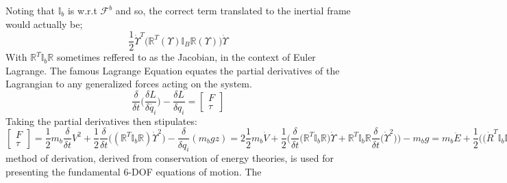 Noting that $\mathbb{I}_b$ is w.r.t $\mathcal{F}^b$ and so, the correct term translated to the inertial frame would actually be;
\begin{equation}
\frac{1}{2}\dot{\Upsilon}^T\big(\mathbb{R}^T(\Upsilon)\mathbb{I}_B\mathbb{R}(\Upsilon)\big)\dot{\Upsilon}
\end{equation} 
With $\mathbb{R}^T\mathbb{I}_b\mathbb{R}$ sometimes reffered to as the Jacobian, in the context of Euler Lagrange. The famous Lagrange Equation equates the partial derivatives of the Lagrangian to any generalized forces acting on the system.
\begin{equation}
\frac{\delta}{\delta t}\bigg(\frac{\delta L}{\delta \dot{q_i}}\bigg)-\frac{\delta L}{\delta q_i} = \begin{bmatrix}
F\\
\tau
\end{bmatrix}
\end{equation}
Taking the partial derivatives then stipulates:
\begin{subequations}
\begin{equation}
\begin{bmatrix}
F\\
\tau
\end{bmatrix}
=
\frac{1}{2}m_b\frac{\delta}{\delta t}V^2+\frac{1}{2}\frac{\delta}{\delta t}\big((\mathbb{R}^{T}\mathbb{I}_b\mathbb{R})\dot{\Upsilon}^{2}\big)-\frac{\delta}{\delta q_i}(m_bgz)
\end{equation}
\begin{equation}
=2\frac{1}{2}m_b\dot{V}+\frac{1}{2}\bigg(\frac{\delta}{\delta t}\big(\mathbb{R}^T\mathbb{I}_b\mathbb{R}\big)\dot{\Upsilon}+\mathbb{R}^T\mathbb{I}_b\mathbb{R}\frac{\delta}{\delta t}\big(\dot{\Upsilon}^2\big)\bigg)-m_bg
\end{equation}
\begin{equation}
=m_b\ddot{E}+\frac{1}{2}\bigg(\big(\dot{R}^T\mathbb{I}_b\mathbb{R}+\mathbb{R}^T\mathbb{I}_b\dot{\mathbb{R}}\big)\dot{\Upsilon}+2\mathbb{R}^T\mathbb{I}_b\mathbb{R}\ddot{\Upsilon}\bigg)-m_bg
\end{equation}
\begin{equation}
=m_b\ddot{E}+\frac{1}{2}\bigg(\big(\mathbb{S}\mathbb{R}(\omega)
\end{equation}
\end{subequations}
 method of derivation, derived from conservation of energy theories, is used for presenting the fundamental 6-DOF equations of motion. The 

